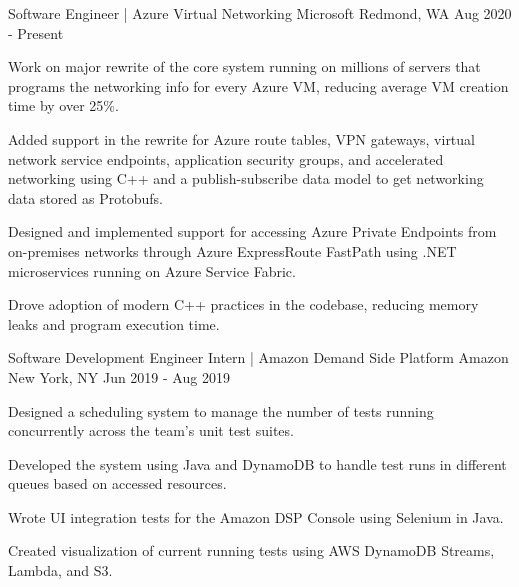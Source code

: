 

\begin{cventries}

  \cventry
  {Software Engineer | Azure Virtual Networking} %
  {Microsoft} %
  {Redmond, WA} %
  {Aug 2020 - Present} %
  {
    \begin{cvitems} %
      \item {Work on major rewrite of the core system running on millions of servers that programs the networking info for every Azure VM, reducing average VM creation time by over 25\%.}
      \item {Added support in the rewrite for Azure route tables, VPN gateways, virtual network service endpoints, application security groups, and accelerated networking using C++ and a publish-subscribe data model to get networking data stored as Protobufs.}
      \item {Designed and implemented support for accessing Azure Private Endpoints from on-premises networks through Azure ExpressRoute FastPath using .NET microservices running on Azure Service Fabric.}
      \item {Drove adoption of modern C++ practices in the codebase, reducing memory leaks and program execution time.}
    \end{cvitems}
  }

  \cventry
  {Software Development Engineer Intern | Amazon Demand Side Platform} %
  {Amazon} %
  {New York, NY} %
  {Jun 2019 - Aug 2019} %
  {
    \begin{cvitems} %
      \item {Designed a scheduling system to manage the number of tests running concurrently across the team's unit test suites.}
      \item {Developed the system using Java and DynamoDB to handle test runs in different queues based on accessed resources.}
      \item {Wrote UI integration tests for the Amazon DSP Console using Selenium in Java.}
      \item {Created visualization of current running tests using AWS DynamoDB Streams, Lambda, and S3.}
    \end{cvitems}
  }


\end{cventries}
